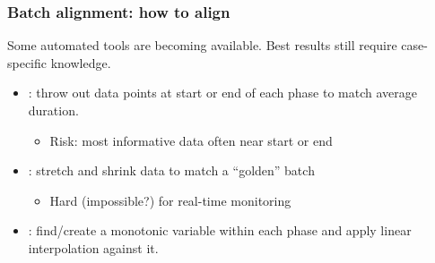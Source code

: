 \begin{frame}\frametitle{Batch alignment: how to align}

Some automated tools are becoming available.  Best results still require case-specific knowledge.
\begin{itemize}
	
	\item	{}: throw out data points at start or end of each phase to match average duration.
	
			\begin{itemize}
				\item	\alert{Risk}:  most informative data often near start or end
			\end{itemize}
			
			\pause
	
	\item	{}: stretch and shrink data to match a ``golden'' batch
	
			\begin{itemize}
				\item	Hard (impossible?) for real-time monitoring
			\end{itemize}
			
			\pause
	
	\item	{}: find/create a monotonic variable within each phase and apply linear interpolation against it.
		
\end{itemize}

\end{frame}

